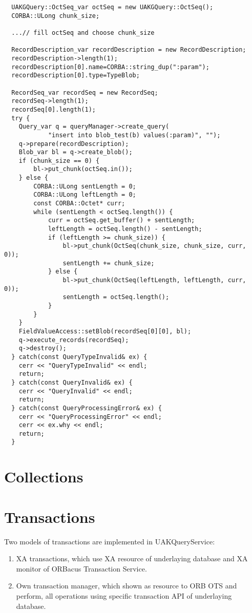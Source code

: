 \documentclass[10pt]{article}
\begin{document}
\begin{verbatim}
  UAKGQuery::OctSeq_var octSeq = new UAKGQuery::OctSeq();
  CORBA::ULong chunk_size;

  ...// fill octSeq and choose chunk_size

  RecordDescription_var recordDescription = new RecordDescription;
  recordDescription->length(1);
  recordDescription[0].name=CORBA::string_dup(":param");
  recordDescription[0].type=TypeBlob;

  RecordSeq_var recordSeq = new RecordSeq;
  recordSeq->length(1);
  recordSeq[0].length(1);
  try {
    Query_var q = queryManager->create_query(
            "insert into blob_test(b) values(:param)", "");
    q->prepare(recordDescription);
    Blob_var bl = q->create_blob();
    if (chunk_size == 0) {
    	bl->put_chunk(octSeq.in());
	} else {
        CORBA::ULong sentLength = 0;
        CORBA::ULong leftLength = 0;
        const CORBA::Octet* curr;
        while (sentLength < octSeq.length()) {
            curr = octSeq.get_buffer() + sentLength;
            leftLength = octSeq.length() - sentLength;
            if (leftLength >= chunk_size)) {
                bl->put_chunk(OctSeq(chunk_size, chunk_size, curr, 0));
                sentLength += chunk_size;
            } else {
                bl->put_chunk(OctSeq(leftLength, leftLength, curr, 0));
                sentLength = octSeq.length();
            }
        }
	}
    FieldValueAccess::setBlob(recordSeq[0][0], bl);
    q->execute_records(recordSeq);
    q->destroy();
  } catch(const QueryTypeInvalid& ex) {
    cerr << "QueryTypeInvalid" << endl;
    return;
  } catch(const QueryInvalid& ex) {
    cerr << "QueryInvalid" << endl;
    return;
  } catch(const QueryProcessingError& ex) {
    cerr << "QueryProcessingError" << endl;
    cerr << ex.why << endl;
    return;
  }
\end{verbatim}


\section{ Collections  }



\section{ Transactions  }

 Two models of transactions are implemented in UAKQueryService:
 \begin{enumerate}
   \item XA transactions, which use XA resource of underlaying database and
    XA monitor of ORBacus Transaction Service.
   \item Own transaction manager, which shown as resource to ORB OTS and perform,
 all operations using specific transaction API of underlaying database.
 \end{enumerate}
\end{document}
